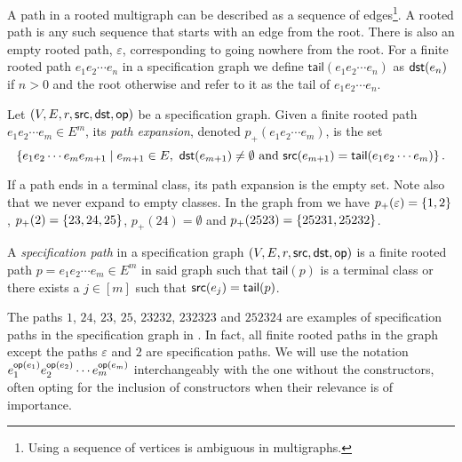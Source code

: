 A path in a rooted multigraph can be described as a sequence of edges\footnote{Using a sequence of vertices is ambiguous in multigraphs.}. A rooted path is any such sequence that starts with an edge from the root. There is also an empty rooted path, $\varepsilon$, corresponding to going nowhere from the root. For a finite rooted path $e_1e_2\dotsm e_n$ in a specification graph we define $\textsf{tail}(e_1e_2\dotsm e_n)$ as $\textsf{dst}(e_n)$ if $n>0$ and the root otherwise and refer to it as the tail of $e_1e_2\dotsm e_n$.

\begin{definition}
Let $(V,E,r,\textsf{src},\textsf{dst},\textsf{op})$ be a specification graph. Given a finite rooted path $e_1e_2\dotsm e_m \in E^m$, its \emph{path expansion}, denoted $p_+(e_1e_2\dotsm e_m)$,
is the set 
\[
    \left\{e_1e_2\dotsm e_m e_{m+1} \mid e_{m+1} \in E, \ \textsf{dst}(e_{m+1}) \neq \emptyset \text{ and } \textsf{src}(e_{m+1}) = \textsf{tail}(e_1e_2\dotsm e_m)\right\}.
\]
\end{definition}
If a path ends in a terminal class, its path expansion is the empty set. Note also that we never expand to empty classes. In the graph from  we have $p_+(\varepsilon) = \left\{1,2\right\}$, $p_+(2) = \left\{23,24,25\right\}$, $p_+(24) = \emptyset$ and $p_+(2523) = \left\{25231, 25232\right\}$.


\begin{definition}
A \emph{specification path} in a specification graph $(V,E,r,\textsf{src},\textsf{dst},\textsf{op})$ is a finite rooted path $p=e_1e_2\dotsm e_m \in E^m$ in said graph such that $\textsf{tail}(p)$ is a terminal class or there exists a $j\in[m]$ such that $\textsf{src}(e_j) = \textsf{tail}(p)$.
\end{definition}
The paths $1$, $24$, $23$, $25$, $23232$, $232323$ and $252324$ are examples of specification paths in the specification graph in . In fact, all finite rooted paths in the graph except the paths $\varepsilon$ and $2$ are specification paths. We will use the notation $e_1^{\textsf{op}(e_1)}e_2^{\textsf{op}(e_2)}\dotsm e_m^{\textsf{op}(e_m)}$ interchangeably with the one without the constructors, often opting for the inclusion of constructors when their relevance is of importance. 

